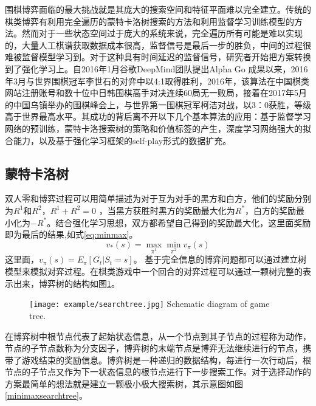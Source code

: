 围棋博弈面临的最大挑战就是其庞大的搜索空间和特征平面难以完全建立。传统的棋类博弈有利用完全遍历的蒙特卡洛树搜索的方法和利用监督学习训练模型的方法。然而对于一些状态空间过于庞大的系统来说，完全遍历所有可能是难以实现的，大量人工棋谱获取数据成本很高，监督信号是最后一步的胜负，中间的过程很难被监督模型学习到。对于这种具有时间延迟的监督信号，研究者开始把方案转换到了强化学习上。自2016年1月谷歌DeepMind团队提出Alpha Go 成果以来，2016年3月与世界围棋冠军李世石的对弈中以4:1取得胜利，2016年，该算法在中国棋类网站注册账号和数十位中日韩围棋高手对决连续60局无一败局，接着在2017年5月的中国乌镇举办的围棋峰会上，与世界第一围棋冠军柯洁对战，以3：0获胜，等级高于世界最高水平。其成功的背后离不开以下几个基本算法的应用：基于监督学习网络的预训练，蒙特卡洛搜索树的策略和价值标签的产生，深度学习网络强大的拟合能力，以及基于强化学习框架的self-play形式的数据扩充。
\subsection{蒙特卡洛树}
双人零和博弈过程可以用简单描述为对于互为对手的黑方和白方，他们的奖励分别为$R^1$和$R^2$，$R^1+R^2=0$ ，当黑方获胜时黑方的奖励最大化为$R^*$，白方的奖励最小化为$-R^*$。结合强化学习思想，双方都希望自己得到的奖励最大化，这里面奖励即为最后的结果,如式\ref{eq:minmax}。
\begin{equation}
\label{eq:minmax}
{v_*}(s) = \mathop {\max }\limits_{{\pi ^1}} \mathop {\min }\limits_{{\pi ^2}} {v_\pi }(s)
\end{equation}
这里面，${v_\pi }(s) = {E_\pi }[{G_t}|{S_t} = s]$。
基于完全信息的博弈问题都可以通过建立树模型来模拟对弈过程。在棋类游戏中一个回合的对弈过程可以通过一颗树完整的表示出来，博弈树的结构如图\ref{fig:tree}。
\begin{figure}[htbp]
	\centering
	\texttt{[image: example/searchtree.jpg]}
	{Schematic diagram of game tree.}
	\label{fig:tree}
\end{figure}

在博弈树中根节点代表了起始状态信息，从一个节点到其子节点的过程称为动作，节点的子节点数称为分支因子，博弈树的末端节点是博弈无法继续进行的节点，携带了游戏结束的奖励信息。博弈树是一种递归的数据结构，每进行一次行动后，根节点的子节点又作为下一状态信息的根节点进行下一步搜索工作。对于选择动作的方案最简单的想法就是建立一颗极小极大搜索树，其示意图如图\ref{minimaxsearchtree}。

